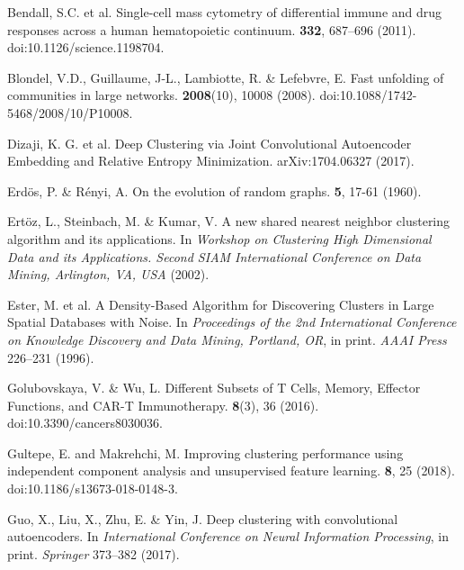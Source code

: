 \documentclass{article}
\begin{document}
\begin{thebibliography}{1}

Bendall, S.C. et al.
\newblock Single-cell mass cytometry of differential immune and drug responses across a human hematopoietic continuum.
 \textbf{332}, 687–696 (2011). doi:10.1126/science.1198704.

Blondel, V.D., Guillaume, J-L., Lambiotte, R. \& Lefebvre, E. 
\newblock Fast unfolding of communities in large networks.
 \textbf{2008}(10), 10008 (2008). doi:10.1088/1742-5468/2008/10/P10008.

Dizaji, K. G. et al.
\newblock Deep Clustering via Joint Convolutional Autoencoder Embedding and Relative Entropy Minimization.
 arXiv:1704.06327 (2017).

Erdös, P. \& Rényi, A.
\newblock On the evolution of random graphs.
 \textbf{5}, 17-61 (1960).

Ertöz, L., Steinbach, M. \& Kumar, V.
\newblock A new shared nearest neighbor clustering algorithm and its applications.
\newblock In {\em Workshop on Clustering High Dimensional Data and its Applications. Second SIAM International Conference on Data Mining, Arlington, VA, USA} (2002). 

Ester, M. et al.
\newblock A Density-Based Algorithm for Discovering Clusters in Large Spatial Databases with Noise.
\newblock In {\em Proceedings of the 2nd International Conference on Knowledge Discovery and Data Mining, Portland, OR}, in print. {\em AAAI Press} 226–231 (1996).

Golubovskaya, V. \& Wu, L.
\newblock Different Subsets of T Cells, Memory, Effector Functions, and CAR-T Immunotherapy.
 \textbf{8}(3), 36 (2016). doi:10.3390/cancers8030036.

Gultepe, E. and Makrehchi, M.
\newblock Improving clustering performance using independent component analysis and unsupervised feature learning.
 \textbf{8}, 25 (2018). doi:10.1186/s13673-018-0148-3.

Guo, X., Liu, X., Zhu, E. \& Yin, J.
\newblock Deep clustering with convolutional autoencoders.
\newblock In {\em International Conference on Neural Information Processing}, in print. {\em Springer} 373–382 (2017).


\end{thebibliography}
\end{document}
